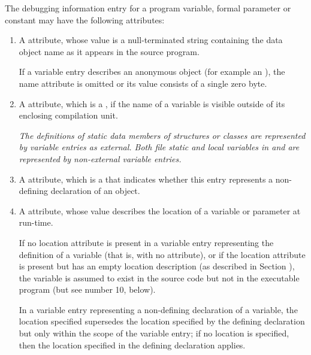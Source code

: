 The debugging information entry for a program variable,
formal parameter or constant may have the following attributes:
\begin{enumerate}[1. ]
\item A \DWATname{} attribute,
whose value is a null-terminated string containing the data object 
name as it appears in the source program.

If a variable entry describes an anonymous object (for example
an ),
the name attribute is omitted or its value consists of a single
zero byte.

\item A \DWATexternalDEFN{} attribute, 
\hypertarget{chap:DWATexternalexternalvariable}{}
which 
is a , if the name
of a variable is visible outside of its enclosing compilation
unit.  

\textit{The definitions of  static data members 
of structures or classes are represented by variable entries 
 as external. Both file static and local variables 
in  and  are represented by 
non-external variable entries.}

\item A \DWATdeclaration{} attribute, 
which is a  that
indicates whether this entry represents a non-defining
declaration of an object.

\item A \DWATlocation{} attribute,
whose value describes the location of a variable or parameter at run-time.

If no location attribute is present in a variable 
entry representing the definition of a variable (that is,
with no 
\DWATdeclaration{} attribute),
or if the location attribute is present but has
an empty location description (as described in Section 
),
the variable is assumed to exist in the source code but not
in the executable program (but see number 10, below).

In a variable entry representing a non-defining declaration 
of a variable, the location specified supersedes the location 
specified by the defining declaration but only within the
scope of the variable entry; if no location is specified, 
then the location specified in the defining declaration 
applies.


\end{enumerate}
